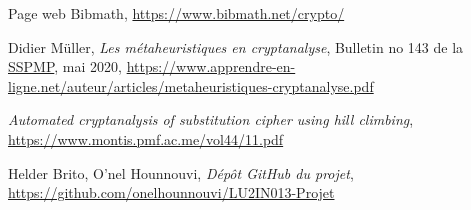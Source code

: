 \documentclass[a4paper]{article}
\begin{document}
\begin{enumerate}[label={[\arabic*]}]
    \item Page web Bibmath, \url{https://www.bibmath.net/crypto/}
    \item Didier Müller, \textit{Les métaheuristiques en cryptanalyse},  Bulletin no 143 de la \href{https://www.vsmp.ch/}{SSPMP}, mai 2020, \url{https://www.apprendre-en-ligne.net/auteur/articles/metaheuristiques-cryptanalyse.pdf}
    \item \textit{Automated cryptanalysis of substitution cipher using hill climbing}, \url{https://www.montis.pmf.ac.me/vol44/11.pdf}
    \item Helder Brito, O'nel Hounnouvi, \textit{Dépôt GitHub du projet}, \url{https://github.com/onelhounnouvi/LU2IN013-Projet}
\end{enumerate}
\end{document}
